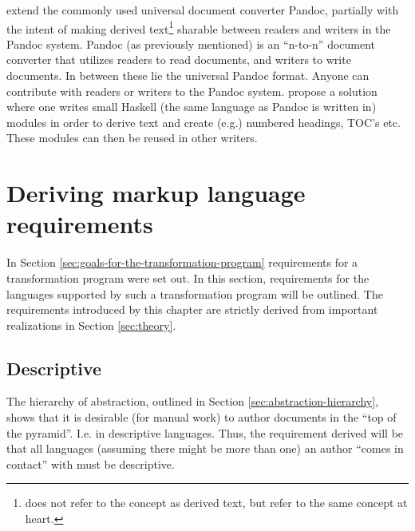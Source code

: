 \documentclass{scrreprt}
\begin{document}
\citet{krijnen} extend the commonly used universal document converter Pandoc\footnotePandoc, partially with the intent of making derived text\footnote{\citet{krijnen} does not refer to the concept as derived text, but refer to the same concept at heart.} sharable between readers and writers in the Pandoc system. Pandoc (as previously mentioned) is an ``n-to-n'' document converter that utilizes readers to read documents, and writers to write documents. In between these lie the universal Pandoc format. Anyone can contribute with readers or writers to the Pandoc system. \citet{krijnen} propose a solution where one writes small Haskell (the same language as Pandoc is written in) modules in order to derive text and create (e.g.) numbered headings, TOC's etc. These modules can then be reused in other writers.





















%
%
%
%
%
%


\chapter{Deriving markup language requirements}
\label{chpt:derived-language-requirements}
In Section \ref{sec:goals-for-the-transformation-program} requirements for a transformation program were set out. In this section, requirements for the languages supported by such a transformation program will be outlined. The requirements introduced by this chapter are strictly derived from important realizations in Section \ref{sec:theory}.


\section{Descriptive}
The hierarchy of abstraction, outlined in Section \ref{sec:abstraction-hierarchy}, shows that it is desirable (for manual work) to author documents in the ``top of the pyramid''. I.e. in descriptive languages. Thus, the requirement derived will be that all languages (assuming there might be more than one) an author ``comes in contact'' with must be descriptive.
\end{document}
